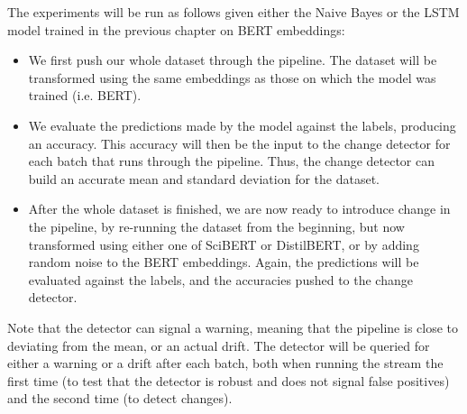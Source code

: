 \documentclass[12pt]{extreport}
\begin{document}
The experiments will be run as follows given either the Naive Bayes or the LSTM model trained in the previous chapter on BERT embeddings:
\begin{itemize}
    \item We first push our whole dataset through the pipeline. The dataset will be transformed using the same embeddings as those on which the model was trained (i.e. BERT). 
    \item We evaluate the predictions made by the model against the labels, producing an accuracy. This accuracy will then be the input to the change detector for each batch that runs through the pipeline. Thus, the change detector can build an accurate mean and standard deviation for the dataset.
    \item After the whole dataset is finished, we are now ready to introduce change in the pipeline, by re-running the dataset from the beginning, but now transformed using either one of SciBERT or DistilBERT, or by adding random noise to the BERT embeddings. Again, the predictions will be evaluated against the labels, and the accuracies pushed to the change detector.
\end{itemize}

Note that the detector can signal a warning, meaning that the pipeline is close to deviating from the mean, or an actual drift. The detector will be queried for either a warning or a drift after each batch, both when running the stream the first time (to test that the detector is robust and does not signal false positives) and the second time (to detect changes).
\end{document}
